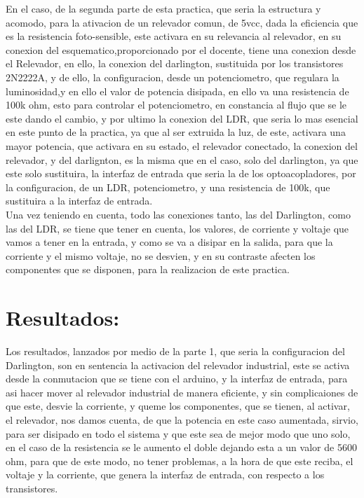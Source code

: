 \documentclass[12pt,a4paper]{article}
\begin{document}
En el caso, de la segunda parte de esta practica, que seria la estructura y acomodo, para la ativacion de un relevador comun, de 5vcc, dada la eficiencia que es la resistencia foto-sensible, este activara en su relevancia al relevador, en su conexion del esquematico,proporcionado por el docente, tiene una conexion desde el Relevador, en ello, la conexion del darlington, sustituida por los transistores 2N2222A, y de ello, la configuracion, desde un potenciometro, que regulara la luminosidad,y en ello el valor de potencia disipada, en ello va una resistencia de 100k ohm, esto para controlar el potenciometro, en constancia al flujo que se le este dando el cambio, y por ultimo la conexion del LDR, que seria lo mas esencial en este punto de la practica, ya que al ser extruida la luz, de este, activara una mayor potencia, que activara en su estado, el relevador conectado, la conexion del relevador, y del darlignton, es la misma que en el caso, solo del darlington, ya que este solo sustituira, la interfaz de entrada que seria la de los optoacopladores, por la configuracion, de un LDR, potenciometro, y una resistencia de 100k, que sustituira a la interfaz de entrada.\\

Una vez teniendo en cuenta, todo las conexiones tanto, las del Darlington, como las del LDR, se tiene que tener en cuenta, los valores, de corriente y voltaje que vamos a tener en la entrada, y como se va a disipar en la salida, para que la corriente y el mismo voltaje, no se desvien, y  en su contraste afecten los componentes que se disponen, para la realizacion de este practica. 

\section{Resultados:}

Los resultados, lanzados por medio de la parte 1, que seria la configuracion del Darlington, son en sentencia la activacion del relevador industrial, este se activa desde la conmutacion que se tiene con el arduino, y la interfaz de entrada, para asi hacer mover al relevador industrial de manera eficiente, y sin complicaiones de que este, desvie la corriente, y queme los componentes, que se tienen, al activar, el relevador, nos damos cuenta, de que la potencia en este caso aumentada, sirvio, para ser disipado en todo el sistema y que este sea de mejor modo que uno solo, en el caso de la resistencia se le aumento el doble dejando esta a un valor de 5600 ohm, para que de este modo, no tener problemas, a la hora de que este reciba, el voltaje y la corriente, que genera la interfaz de entrada, con respecto a los transistores.\\
\end{document}
